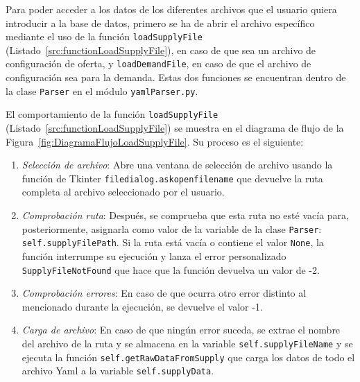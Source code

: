 
Para poder acceder a los datos de los diferentes archivos que el usuario quiera introducir a la base de datos, primero se ha de abrir el archivo específico mediante el uso de la función \texttt{loadSupplyFile} (Listado~\ref{src:functionLoadSupplyFile}), en caso de que sea un archivo de configuración de oferta, y \texttt{loadDemandFile}, en caso de que el archivo de configuración sea para la demanda.
Estas dos funciones se encuentran dentro de la clase \texttt{Parser} en el módulo \texttt{yamlParser.py}.

 El comportamiento de la función \texttt{loadSupplyFile} (Listado~\ref{src:functionLoadSupplyFile}) se muestra en el diagrama de flujo de la Figura~\ref{fig:DiagramaFlujoLoadSupplyFile}. Su proceso es el siguiente:
\begin{enumerate}
    \item \textit{Selección de archivo}: Abre una ventana de selección de archivo usando la función de Tkinter \texttt{filedialog.askopenfilename} que devuelve la ruta completa al archivo seleccionado por el usuario.
    \item \textit{Comprobación ruta}: Después, se comprueba que esta ruta no esté vacía para, posteriormente, asignarla como valor de la variable de la clase \texttt{Parser}: \texttt{self.supplyFilePath}. Si la ruta está vacía o contiene el valor \texttt{None}, la función interrumpe su ejecución y lanza el error personalizado \texttt{SupplyFileNotFound} que hace que la función devuelva un valor de -2.
    \item \textit{Comprobación errores}: En caso de que ocurra otro error distinto al mencionado durante la ejecución, se devuelve el valor -1.
    \item \textit{Carga de archivo}: En caso de que ningún error suceda, se extrae el nombre del archivo de la ruta y se almacena en la variable \texttt{self.supplyFileName} y se ejecuta la función \texttt{self.getRawDataFromSupply} que carga los datos de todo el archivo \acrshort{Yaml} a la variable \texttt{self.supplyData}. 
\end{enumerate}

